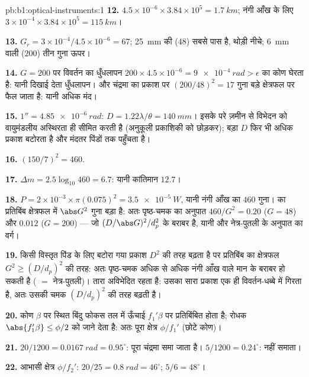 \begin{solution}{pb:b1:optical-instruments:1}
\textbf{12.} $4.5\times10^{-6} \times 3.84\times10^5 = \qty{1.7}{km}$;
नंगी आँख के लिए $3\times10^{-4} \times 3.84\times10^5 = \qty{115}{km}$।

\textbf{13.} $G_r = 3\times10^{-4}/4.5\times10^{-6} = 67$; \qty{25}{mm}
की  ($48$) सबसे पास है, थोड़ी नीचे; \qty{6}{mm} वाली ($200$) तीन
गुना ऊपर।

\textbf{14.} $G = 200$ पर विवर्तन का धुँधलापन $200 \times 4.5
\times10^{-6} = \qty{9e-4}{rad} > \epsilon$ का कोण घेरता है: यानी दिखाई देता
धुँधलापन। और चंद्रमा का प्रकाश  पर $(200/48)^2 = 17$ गुना बड़े
क्षेत्रफल पर फैल जाता है: यानी अधिक मंद।

\textbf{15.} $1'' = \qty{4.85e-6}{rad}$: $D = 1.22\lambda/\theta =
\qty{140}{mm}$। इसके परे ज़मीन से विभेदन को वायुमंडलीय अस्थिरता ही सीमित करती
है (अनुकूली प्रकाशिकी को छोड़कर); बड़ा $D$ फिर भी अधिक प्रकाश बटोरता है और
मंदतर पिंडों तक पहुँचता है।

\textbf{16.} $(150/7)^2 = 460$.

\textbf{17.} $\Delta m = 2.5\log_{10}460 = 6.7$: यानी कांतिमान $12.7$।

\textbf{18.} $P = 2\times10^{-3} \times \pi(0.075)^2 = \qty{3.5e-5}{W}$,
यानी नंगी आँख का $460$ गुना।  का प्रतिबिंब क्षेत्रफल में $\abs G^2$
गुना बड़ा है: अतः पृष्ठ-चमक का अनुपात $460/G^2 = 0.20$ ($G = 48$) और
$0.012$ ($G = 200$) --- जो $(D/\abs G)^2/d_p^2$ के बराबर है, यानी  और नेत्र-पुतली के अनुपात का वर्ग।

\textbf{19.} किसी विस्तृत पिंड के लिए बटोरा गया प्रकाश $D^2$ की तरह बढ़ता है
पर प्रतिबिंब का क्षेत्रफल $G^2 \geq (D/d_p)^2$ की तरह: अतः पृष्ठ-चमक
अधिक से अधिक नंगी आँख वाले मान के बराबर हो सकती है ( $=$
नेत्र-पुतली)। तारा अविभेदित रहता है: उसका सारा प्रकाश एक ही विवर्तन-धब्बे में
गिरता है, अतः उसकी चमक $(D/d_p)^2$ की तरह बढ़ती है।

\textbf{20.} कोण $\beta$ पर स्थित बिंदु फोकस तल में ऊँचाई $f_1'\beta$ पर
प्रतिबिंबित होता है; रोधक $\abs{f_1'\beta} \leq \phi/2$ को जाने देता है: अतः
पूरा क्षेत्र $\phi/f_1'$ (छोटे कोण)।

\textbf{21.} $20/1200 = \qty{0.0167}{rad} = 0.95^\circ$: पूरा चंद्रमा
समा जाता है। $5/1200 = 0.24^\circ$: नहीं समाता।

\textbf{22.} आभासी क्षेत्र $\phi/f_2'$: $20/25 = \qty{0.8}{rad} = 46^\circ$;
$5/6 = 48^\circ$।


\end{solution}
